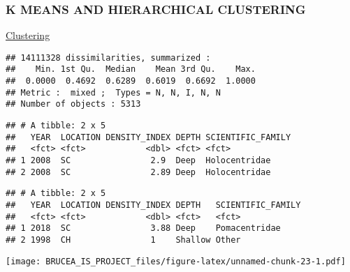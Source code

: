 \documentclass[
]{article}
\begin{document}
\hypertarget{k-means-and-hierarchical-clustering}{%
\subsubsection{K MEANS AND HIERARCHICAL
CLUSTERING}\label{k-means-and-hierarchical-clustering}}

\href{https://www.r-bloggers.com/2016/06/clustering-mixed-data-types-in-r/}{Clustering}

\begin{verbatim}
## 14111328 dissimilarities, summarized :
##    Min. 1st Qu.  Median    Mean 3rd Qu.    Max. 
##  0.0000  0.4692  0.6289  0.6019  0.6692  1.0000 
## Metric :  mixed ;  Types = N, N, I, N, N 
## Number of objects : 5313
\end{verbatim}

\begin{verbatim}
## # A tibble: 2 x 5
##   YEAR  LOCATION DENSITY_INDEX DEPTH SCIENTIFIC_FAMILY
##   <fct> <fct>            <dbl> <fct> <fct>            
## 1 2008  SC                2.9  Deep  Holocentridae    
## 2 2008  SC                2.89 Deep  Holocentridae
\end{verbatim}

\begin{verbatim}
## # A tibble: 2 x 5
##   YEAR  LOCATION DENSITY_INDEX DEPTH   SCIENTIFIC_FAMILY
##   <fct> <fct>            <dbl> <fct>   <fct>            
## 1 2018  SC                3.88 Deep    Pomacentridae    
## 2 1998  CH                1    Shallow Other
\end{verbatim}

\texttt{[image: BRUCEA\_IS\_PROJECT\_files/figure-latex/unnamed-chunk-23-1.pdf]}
\end{document}
